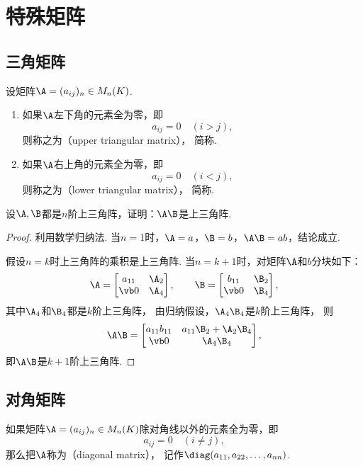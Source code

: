 \section{特殊矩阵}
\subsection{三角矩阵}
\begin{definition}
设矩阵\(\A=(a_{ij})_n \in M_n(K)\).
\begin{enumerate}
	\item 如果\(\A\)左下角的元素全为零，即\[
		a_{ij} = 0
		\quad(i>j),
	\]
	则称之为（upper triangular matrix），
	简称.

	\item 如果\(\A\)右上角的元素全为零，即\[
		a_{ij} = 0
		\quad(i<j),
	\]
	则称之为（lower triangular matrix），
	简称.
\end{enumerate}
\end{definition}

\begin{example}
设\(\A,\B\)都是\(n\)阶上三角阵，证明：\(\A\B\)是上三角阵.
\begin{proof}
利用数学归纳法.
当\(n=1\)时，\(\A=a\)，\(\B=b\)，\(\A\B = ab\)，结论成立.

假设\(n=k\)时上三角阵的乘积是上三角阵.
当\(n=k+1\)时，对矩阵\(\A\)和\(b\)分块如下：\[
	\A = \begin{bmatrix}
		a_{11} & \A_2 \\
		\vb0 & \A_4
	\end{bmatrix},
	\qquad
	\B = \begin{bmatrix}
		b_{11} & \B_2 \\
		\vb0 & \B_4
	\end{bmatrix},
\]
其中\(\A_4\)和\(\B_4\)都是\(k\)阶上三角阵，
由归纳假设，\(\A_4 \B_4\)是\(k\)阶上三角阵，
则\[
	\A\B = \begin{bmatrix}
		a_{11} b_{11} & a_{11} \B_2 + \A_2 \B_4 \\
		\vb0 & \A_4 \B_4
	\end{bmatrix},
\]
即\(\A\B\)是\(k+1\)阶上三角阵.
\end{proof}
\end{example}

\subsection{对角矩阵}
\begin{definition}
如果矩阵\(\A=(a_{ij})_n \in M_n(K)\)除对角线以外的元素全为零，即\[
	a_{ij} = 0
	\quad(i \neq j),
\]
那么把\(\A\)称为（diagonal matrix），
记作\(\diag(a_{11},a_{22},\dotsc,a_{nn})\).
\end{definition}

